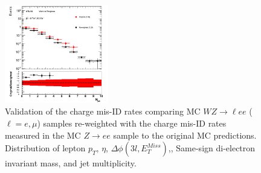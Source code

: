 \begin{figure}[htp]
 \includegraphics[width=0.4\textwidth]{figures/ChargeMisID/Validation_ChargeMisIDRates_WZ_JetMultiplicity.png}

 \caption{Validation of the charge mis-ID rates comparing MC $WZ\rightarrow \ell ee$ ($\ell=e,\mu$) samples re-weighted with the charge mis-ID rates measured in the MC $Z\to{}ee$ 
 sample to the original MC predictions. Distribution of lepton $p_{T}$, $\eta$, $\Delta \phi(3l,E_{T}^{Miss})$,\met{}, Same-sign di-electron invariant mass, and jet multiplicity.}
 \label{fig:ChargeMisID_Validation_WZ}
 \end{figure}
 
